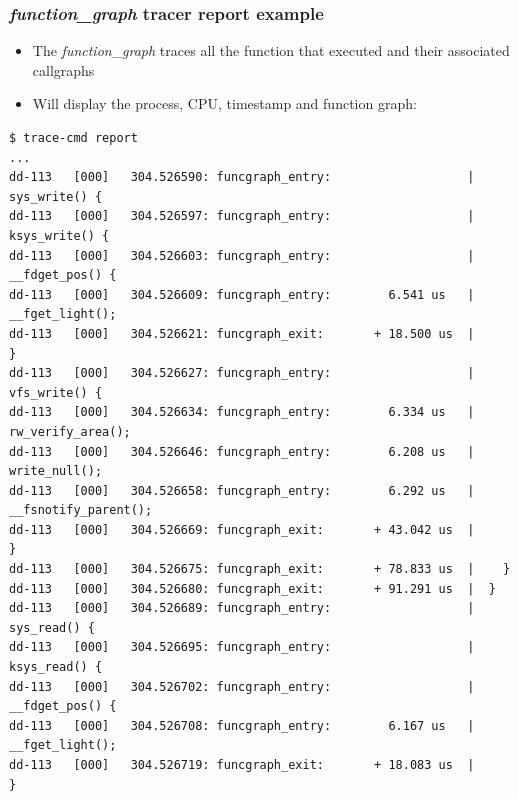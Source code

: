 \begin{frame}[fragile]
  \frametitle{{\em function\_graph} tracer report example}
  \begin{itemize}
    \item The {\em function\_graph} traces all the function that
      executed and their associated callgraphs
    \item Will display the process, CPU, timestamp and function graph:
  \end{itemize}
  \begin{block}{}
    \begin{verbatim}
$ trace-cmd report
...
dd-113   [000]   304.526590: funcgraph_entry:                   |  sys_write() {
dd-113   [000]   304.526597: funcgraph_entry:                   |    ksys_write() {
dd-113   [000]   304.526603: funcgraph_entry:                   |      __fdget_pos() {
dd-113   [000]   304.526609: funcgraph_entry:        6.541 us   |        __fget_light();
dd-113   [000]   304.526621: funcgraph_exit:       + 18.500 us  |      }
dd-113   [000]   304.526627: funcgraph_entry:                   |      vfs_write() {
dd-113   [000]   304.526634: funcgraph_entry:        6.334 us   |        rw_verify_area();
dd-113   [000]   304.526646: funcgraph_entry:        6.208 us   |        write_null();
dd-113   [000]   304.526658: funcgraph_entry:        6.292 us   |        __fsnotify_parent();
dd-113   [000]   304.526669: funcgraph_exit:       + 43.042 us  |      }
dd-113   [000]   304.526675: funcgraph_exit:       + 78.833 us  |    }
dd-113   [000]   304.526680: funcgraph_exit:       + 91.291 us  |  }
dd-113   [000]   304.526689: funcgraph_entry:                   |  sys_read() {
dd-113   [000]   304.526695: funcgraph_entry:                   |    ksys_read() {
dd-113   [000]   304.526702: funcgraph_entry:                   |      __fdget_pos() {
dd-113   [000]   304.526708: funcgraph_entry:        6.167 us   |        __fget_light();
dd-113   [000]   304.526719: funcgraph_exit:       + 18.083 us  |      }
    \end{verbatim}
  \end{block}
\end{frame}


